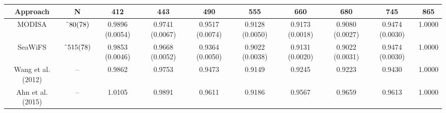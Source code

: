 \documentclass[preview]{standalone}
\begin{document}
\begin{threeparttable}

\normalsize
\centering
\begin{tabular}{cccccccccc} 
 \hline 
Approach & N\tnote{\it a}			  & 412 	 			& 443 	  			& 490    			& 555    			& 660    						& 680    						& 745    			& 865    \\ \hline
MODISA\tnote{\it b}& $\char`\~80(78)$ & 0.9896 (0.0054) 	& 0.9741 (0.0067) & 0.9517 (0.0074) & 0.9128 (0.0050) & 0.9173 (0.0018) 			& 0.9080 (0.0027) &  0.9474 (0.0030) 	& 1.0000 \\%
SeaWiFS\tnote{\it b}& $\char`\~515(78)$ & 0.9853 (0.0046) & 0.9668 (0.0052) & 0.9364 (0.0050) & 0.9022 (0.0038) & 0.9131 (0.0020)\tnote{\it c} & 0.9022 (0.0031)\tnote{\it c} & 0.9474 (0.0030) 	& 1.0000 \\
Wang et al. (2012)& 	--				& 0.9862 			& 0.9753 			& 0.9473 			& 0.9149 			& 0.9245 & 0.9223 & 0.9430 & 1.0000 \\
Ahn et al. (2015)& 	-- & 1.0105 & 0.9891 & 0.9611 & 0.9186 & 0.9567 & 0.9659 & 0.9613 & 1.0000 \\


\end{tabular}
\end{threeparttable}
\end{document}
